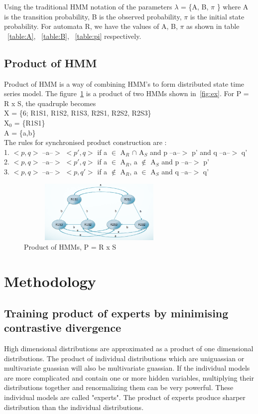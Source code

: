 \documentclass[10pt, conference, compsocconf]{IEEEtran}
\begin{document}
Using the traditional HMM notation of the parameters $\lambda$ = \{A, B, $\pi$ \} where A is the transition probability, B is the observed probability, $\pi$ is the initial state probability. For automata R, we have the values of A, B, $\pi$ as shown in table ~\ref{table:A}, ~\ref{table:B}, ~\ref{table:pi} respectively.

\subsection{Product of HMM}
\label {sec:pohmm}
Product of HMM is a way of combining HMM's to form distributed state time series model. The figure~\ref{fig:pohmm} is a product of two HMMs shown in~\ref{fig:ex}. For  P = R x S, the quadruple becomes\\
X = \{6; R1S1, R1S2, R1S3, R2S1, R2S2, R2S3\} \\
X$_{0}$ = \{R1S1\} \\
A = \{a,b\} \\
The rules for synchronised product construction are : \\
1. $<p,q>$ --a--$>$ $<p',q>$ if a $\in$ A$_{R}$ $\cap$ A$_{S}$ and p --a--$>$ p' and q --a--$>$ q'	\\
2. $<p,q>$ --a--$>$ $<p',q>$ if a $\in$ A$_{R}$, a $\notin$ A$_{S}$ and p --a--$>$ p'	\\
3. $<p,q>$ --a--$>$ $<p,q'>$ if a $\notin$ A$_{R}$, a $\in$ A$_{S}$ and q --a--$>$ q'	\\

\begin{figure}[t]
\centering
\includegraphics[width=8cm,height=3cm]{product.png}
\caption{Product of HMMs, P = R x S}
\label{fig:pohmm}
\end{figure}


\section{ Methodology }
\label{sec:method}
\subsection{Training product of experts by minimising contrastive divergence}
High dimensional distributions are approximated as a product of one dimensional distributions. The product of individual distributions which are uniguassian or multivariate guassian will also be multivariate guassian. If the individual models are more complicated and contain one or more hidden variables, multiplying their distributions together and renormalizing them can be very powerful. These individual models are called "experts".
The product of experts produce sharper distribution than the individual distributions\cite{hinton2000}.
\end{document}
